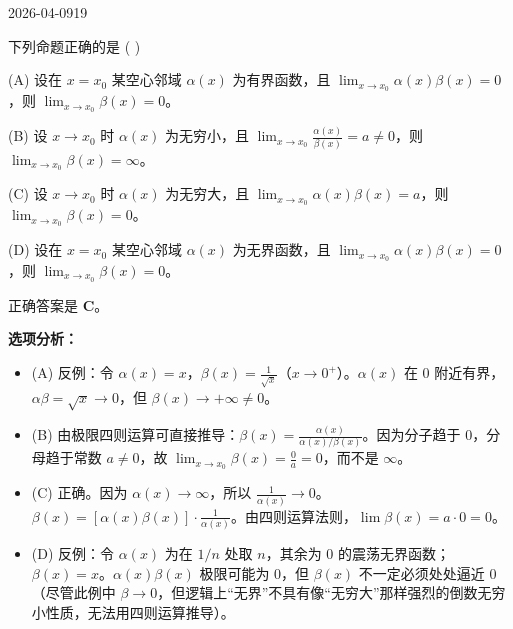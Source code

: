 \begin{mistake}{2026-04-09}{19}

\begin{problemcontent}
下列命题正确的是 ( )

(A) 设在 \( x=x_0 \) 某空心邻域 \( \alpha(x) \) 为有界函数，且 \( \lim_{x\to x_0} \alpha(x)\beta(x) = 0 \)，则 \( \lim_{x\to x_0} \beta(x) = 0 \)。

(B) 设 \( x\to x_0 \) 时 \( \alpha(x) \) 为无穷小，且 \( \lim_{x\to x_0} \frac{\alpha(x)}{\beta(x)} = a \neq 0 \)，则 \( \lim_{x\to x_0} \beta(x) = \infty \)。

(C) 设 \( x\to x_0 \) 时 \( \alpha(x) \) 为无穷大，且 \( \lim_{x\to x_0} \alpha(x)\beta(x) = a \)，则 \( \lim_{x\to x_0} \beta(x) = 0 \)。

(D) 设在 \( x=x_0 \) 某空心邻域 \( \alpha(x) \) 为无界函数，且 \( \lim_{x\to x_0} \alpha(x)\beta(x) = 0 \)，则 \( \lim_{x\to x_0} \beta(x) = 0 \)。
\end{problemcontent}

\begin{solutioncontent}
正确答案是 \textbf{C}。

\textbf{选项分析：}
\begin{itemize}
 \item (A) 反例：令 \(\alpha(x) = x\)，\(\beta(x) = \frac{1}{\sqrt{x}}\)（\(x \to 0^+\)）。\(\alpha(x)\) 在 \(0\) 附近有界，\(\alpha\beta = \sqrt{x} \to 0\)，但 \(\beta(x) \to +\infty \neq 0\)。
 \item (B) 由极限四则运算可直接推导：\(\beta(x) = \frac{\alpha(x)}{\alpha(x)/\beta(x)}\)。因为分子趋于 \(0\)，分母趋于常数 \(a \neq 0\)，故 \(\lim_{x \to x_0} \beta(x) = \frac{0}{a} = 0\)，而不是 \(\infty\)。
 \item (C) 正确。因为 \(\alpha(x) \to \infty\)，所以 \(\frac{1}{\alpha(x)} \to 0\)。\(\beta(x) = [\alpha(x)\beta(x)] \cdot \frac{1}{\alpha(x)}\)。由四则运算法则，\(\lim \beta(x) = a \cdot 0 = 0\)。
 \item (D) 反例：令 \(\alpha(x)\) 为在 \(1/n\) 处取 \(n\)，其余为 0 的震荡无界函数；\(\beta(x) = x\)。\(\alpha(x)\beta(x)\) 极限可能为 0，但 \(\beta(x)\) 不一定必须处处逼近 0（尽管此例中 \(\beta \to 0\)，但逻辑上“无界”不具有像“无穷大”那样强烈的倒数无穷小性质，无法用四则运算推导）。
\end{itemize}
\end{solutioncontent}


\end{mistake}
